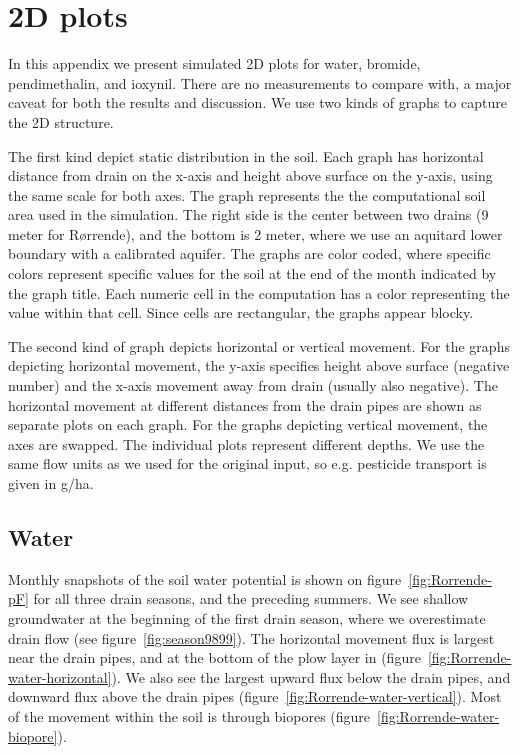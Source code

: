 \newcommand{\figrorrende}[1]{\texttt{[image: fig/\#1]}}
\newcommand{\figrorrendel}[1]{\hspace*{-2cm}\figrorrende{#1}}

\chapter{2D plots}
\label{app:plot-2d}

In this appendix we present simulated 2D plots for water, bromide,
pendimethalin, and ioxynil.  There are no measurements to compare
with, a major caveat for both the results and discussion.  We use two
kinds of graphs to capture the 2D structure.

The first kind depict static distribution in the soil.  Each graph has
horizontal distance from drain on the x-axis and height above surface
on the y-axis, using the same scale for both axes.  The graph
represents the the computational soil area used in the simulation.
The right side is the center between two drains (9 meter for
R{\o}rrende), and the bottom is 2 meter, where we use an aquitard
lower boundary with a calibrated aquifer.  The graphs are color coded,
where specific colors represent specific values for the soil at the
end of the month indicated by the graph title.  Each numeric cell in
the computation has a color representing the value within that cell.
Since cells are rectangular, the graphs appear blocky.

The second kind of graph depicts horizontal or vertical movement.  For
the graphs depicting horizontal movement, the y-axis specifies height
above surface (negative number) and the x-axis movement away from
drain (usually also negative).  The horizontal movement at different
distances from the drain pipes are shown as separate plots on each
graph.  For the graphs depicting vertical movement, the axes are
swapped.  The individual plots represent different depths.  We use the
same flow units as we used for the original input, so e.g. pesticide
transport is given in g/ha.

\FloatBarrier
\section{Water}

Monthly snapshots of the soil water potential is shown on
figure~\ref{fig:Rorrende-pF} for all three drain seasons, and the
preceding summers. We see shallow groundwater at the beginning of the
first drain season, where we overestimate drain flow (see
figure~\ref{fig:season9899}).  The horizontal movement flux is largest
near the drain pipes, and at the bottom of the plow layer in
(figure~\ref{fig:Rorrende-water-horizontal}).  We also see the largest
upward flux below the drain pipes, and downward flux above the drain
pipes (figure~\ref{fig:Rorrende-water-vertical}).  Most of the
movement within the soil is through biopores
(figure~\ref{fig:Rorrende-water-biopore}).

